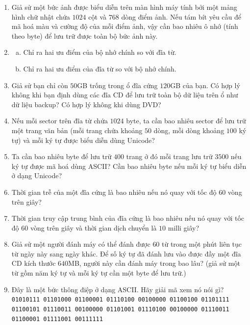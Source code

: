 \begin{multicols}{2}
\begin{enumerate}
  \item Giả sử một bức ảnh được biểu diễn trên màn hình máy tính bởi một mảng hình chữ
    nhật chứa $1024$ cột và $768$ dòng điểm ảnh. Nếu tám bít yêu cầu để mã hoá màu và
    cường độ của mỗi điểm ảnh, vậy cần bao nhiêu ô nhớ (tính theo byte) để lưu trữ được
    toàn bộ bức ảnh này.

  \item \begin{enumerate}[a.]
    \item Chỉ ra hai ưu điểm của bộ nhớ chính so với đĩa từ.
    \item Chỉ ra hai ưu điểm của đĩa từ so với bộ nhớ chính.
    \end{enumerate}

  \item Giả sử bạn chỉ còn $50$GB trống trong ổ đĩa cứng $120$GB của bạn. Có hợp lý không
    khi bạn định dùng các đĩa CD để lưu trữ toàn bộ dữ liệu trên ổ như dữ liệu backup? Có
    hợp lý không khi dùng DVD?

  \item Nếu mỗi sector trên đĩa từ chứa $1024$ byte, ta cần bao nhiêu sector để lưu trữ
    một trang văn bản (mỗi trang chứa khoảng $50$ dòng, mỗi dòng khoảng $100$ ký tự) và
    mỗi ký tự được biểu diễn dùng Unicode?

  \item Ta cần bao nhiêu byte để lưu trữ $400$ trang ở đó mỗi trang lưu trữ $3500$ nếu ký
    tự được mã hoá dùng ASCII? Cần bao nhiêu byte nếu mỗi ký tự biểu diễn ở dạng Unicode?

  \item Thời gian trễ của một đĩa cứng là bao nhiêu nếu nó quay với tốc độ $60$ vòng trên
    giây?

  \item Thời gian truy cập trung bình của đĩa cứng là bao nhiêu nếu nó quay với tốc độ
    $60$ vòng trên giây và thời gian dịch chuyển là $10$ milli giây?

  \item Giả sử một người đánh máy có thể đánh được $60$ từ trong một phút liên tục từ ngày
    này sang ngày khác. Để số ký tự đã đánh lưu vào được đầy một đĩa CD kích thước
    $640$MB, người này cần đánh máy trong bao lâu? (giả sử một từ gồm năm ký tự và mỗi ký
    tự cần một byte để lưu trữ.)

  \item Đây là một bức thông điệp ở dạng ASCII. Hãy giải mã xem nó nói
    gì? \\
    \texttt{01010111 01101000 01100001 01110100 00100000 01100100 01101111 01100101
      01110011 00100000 01101001 01110100 00100000 01110011 01100001 01111001 00111111}


\end{enumerate}
\end{multicols}

